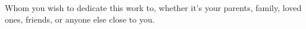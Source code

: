 Whom you wish to dedicate this work to, whether it's your parents, family, loved ones, friends, or anyone else close to you.
